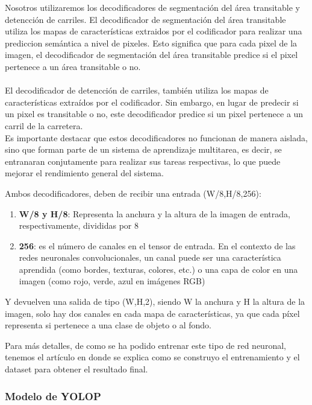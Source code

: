 Nosotros utilizaremos los decodificadores de segmentación del área transitable 
y detencción de carriles. El decodificador de segmentación del área transitable utiliza los mapas de características
extraidos por el codificador para realizar una prediccion semántica a nivel de pixeles. Esto significa que 
para cada pixel de la imagen, el decodificador de segmentación del área transitable predice si el pixel 
pertenece a un área transitable o no. 
\\
\\
El decodificador de detencción de carriles, también utiliza los mapas de características extraídos 
por el codificador. Sin embargo, en lugar de predecir si un pixel es transitable o no, este decodificador
predice si un pixel pertenece a un carril de la carretera. 
\\
Es importante destacar que estos decodificadores no funcionan de manera aislada, sino que forman parte
de un sistema de aprendizaje multitarea, es decir, se entranaran conjutamente para realizar sus tareas
respectivas, lo que puede mejorar el rendimiento general del sistema.

Ambos decodificadores, deben de recibir una entrada (W/8,H/8,256): 
\begin{enumerate}
  \item \textbf{W/8 y H/8}: Representa la anchura y la altura de la imagen de entrada, respectivamente, divididas por 8
  \item \textbf{256}: es el número de 
  canales en el tensor de entrada. En el contexto de las redes neuronales convolucionales, 
  un canal puede ser una característica aprendida (como bordes, texturas, colores, etc.) o una capa de color en una imagen (como rojo, verde, azul en imágenes RGB)
\end{enumerate}

Y devuelven una salida de tipo (W,H,2), siendo W la anchura y H la altura de la imagen, solo hay dos canales en cada mapa de características, ya que cada píxel 
representa si pertenece a una clase de objeto o al fondo. 

Para más detalles, de como se ha podido entrenar este tipo de red neuronal, tenemos el artículo \cite{YOLOP} en donde se explica
como se construyo el entrenamiento y el dataset para obtener el resultado final. 
\subsubsection{Modelo de YOLOP}
\label{sec:Modelo_YOLOP}

